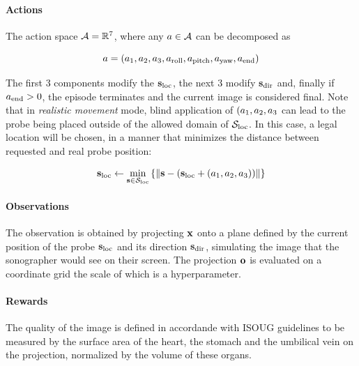 \paragraph{Actions}

The action space $\mathcal{A} = \mathbb{R}^{7}$, where any $a \in \mathcal{A}$ can be decomposed as

\begin{equation}
    a = (a_1 , a_2 , a_3 , a_\text{roll} , a_\text{pitch} , a_\text{yaw}, a_\text{end})
\end{equation}

The first 3 components modify the $\textbf{s}_\text{loc}$, the next 3 modify $\textbf{s}_\text{dir}$ and, finally if $a_\text{end} > 0$, the episode terminates and the current image is considered final.
Note that in \emph{realistic movement} mode, blind application of $(a_1 , a_2 , a_3$ can lead to the probe being placed outside of the allowed domain of $\mathcal{S}_\text{loc}$.
In this case, a legal location will be chosen, in a manner that minimizes the distance between requested and real probe position:

\begin{equation}
    \textbf{s}_\text{loc} \leftarrow \min_{\textbf{s} \in \mathcal{S}_\text{loc}} \left\{ \lVert \textbf{s} - (\textbf{s}_\text{loc} + (a_1 , a_2 , a_3)) \rVert \right\}
\end{equation}

\paragraph{Observations}

The observation is obtained by projecting $\mathbf{x}$ onto a plane defined by the current position of the probe $\textbf{s}_\text{loc}$ and its direction $\textbf{s}_\text{dir}$, simulating the image that the sonographer would see on their screen.
The projection $\mathbf{o}$ is evaluated on a coordinate grid the scale of which is a hyperparameter.

\paragraph{Rewards}

The quality of the image is defined in accordande with ISOUG guidelines \cite{isoug-guidelines} to be measured by the surface area of the heart, the stomach and the umbilical vein on the projection, normalized by the volume of these organs.

